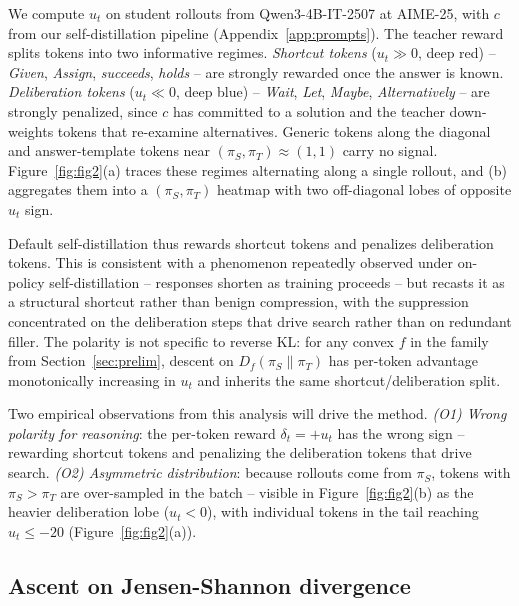 \documentclass{llmxive}
\begin{document}
We compute $u_t$ on student rollouts from Qwen3-4B-IT-2507 at AIME-25, with $c$ from our self-distillation pipeline (Appendix~\ref{app:prompts}). The teacher reward splits tokens into two informative regimes. \emph{Shortcut tokens} ($u_t \gg 0$, deep red) -- \emph{Given}, \emph{Assign}, \emph{succeeds}, \emph{holds} -- are strongly rewarded once the answer is known. \emph{Deliberation tokens} ($u_t \ll 0$, deep blue) -- \emph{Wait}, \emph{Let}, \emph{Maybe}, \emph{Alternatively} -- are strongly penalized, since $c$ has committed to a solution and the teacher down-weights tokens that re-examine alternatives. Generic tokens along the diagonal and answer-template tokens near $(\pi_S, \pi_T) \approx (1,1)$ carry no signal. Figure~\ref{fig:fig2}(a) traces these regimes alternating along a single rollout, and (b) aggregates them into a $(\pi_S, \pi_T)$ heatmap with two off-diagonal lobes of opposite $u_t$ sign.

Default self-distillation thus rewards shortcut tokens and penalizes deliberation tokens. This is consistent with a phenomenon repeatedly observed under on-policy self-distillation -- responses shorten as training proceeds \citep{sdpo,kim2026does,opsdc} -- but recasts it as a structural shortcut rather than benign compression, with the suppression concentrated on the deliberation steps that drive search rather than on redundant filler. The polarity is not specific to reverse KL: for any convex $f$ in the family from Section~\ref{sec:prelim}, descent on $D_f(\pi_S \| \pi_T)$ has per-token advantage monotonically increasing in $u_t$ and inherits the same shortcut/deliberation split.

Two empirical observations from this analysis will drive the method. \emph{(O1) Wrong polarity for reasoning}: the per-token reward $\delta_t = +u_t$ has the wrong sign -- rewarding shortcut tokens and penalizing the deliberation tokens that drive search. \emph{(O2) Asymmetric distribution}: because rollouts come from $\pi_S$, tokens with $\pi_S > \pi_T$ are over-sampled in the batch -- visible in Figure~\ref{fig:fig2}(b) as the heavier deliberation lobe ($u_t < 0$), with individual tokens in the tail reaching $u_t \le -20$ (Figure~\ref{fig:fig2}(a)).



\subsection{Ascent on Jensen-Shannon divergence}
\label{sec:antisd:stab}
\vspace{-0.5em}
\end{document}
